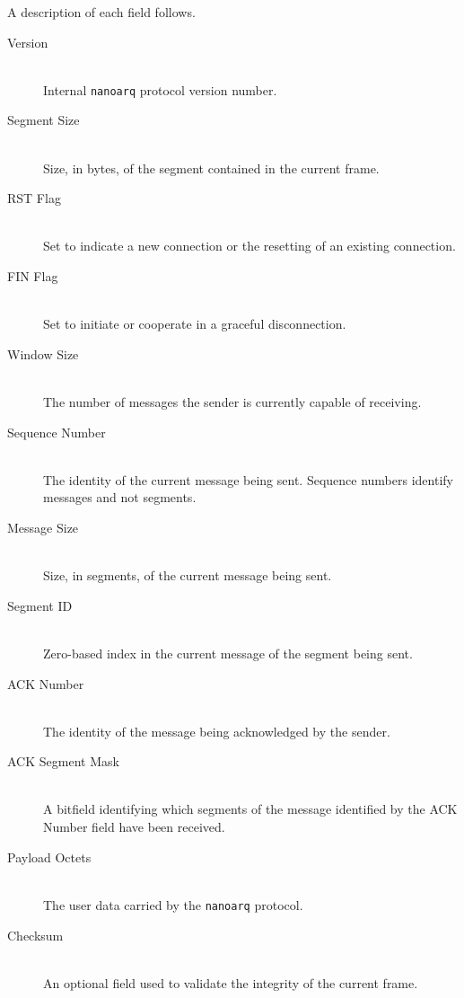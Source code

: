 \documentclass[11pt]{article}
\newcommand{\nanoarq}{\texttt{nanoarq}}
\begin{document}
A description of each field follows.
\begin{description}
\item[Version] \hfill \\
    Internal \nanoarq{} protocol version number.

\item[Segment Size] \hfill \\
    Size, in bytes, of the segment contained in the current frame.

\item[RST Flag] \hfill \\
    Set to indicate a new connection or the resetting of an existing connection.

\item[FIN Flag] \hfill \\
    Set to initiate or cooperate in a graceful disconnection.

\item[Window Size] \hfill \\
    The number of messages the sender is currently capable of receiving.

\item[Sequence Number] \hfill \\
    The identity of the current message being sent. Sequence numbers identify messages and not segments.

\item[Message Size] \hfill \\
    Size, in segments, of the current message being sent.

\item[Segment ID] \hfill \\
    Zero-based index in the current message of the segment being sent.

\item[ACK Number] \hfill \\
    The identity of the message being acknowledged by the sender.

\item[ACK Segment Mask] \hfill \\
    A bitfield identifying which segments of the message identified by the ACK Number field have been received.

\item[Payload Octets] \hfill \\
    The user data carried by the \nanoarq{} protocol.

\item[Checksum] \hfill \\
    An optional field used to validate the integrity of the current frame.

\end{description}
\end{document}
